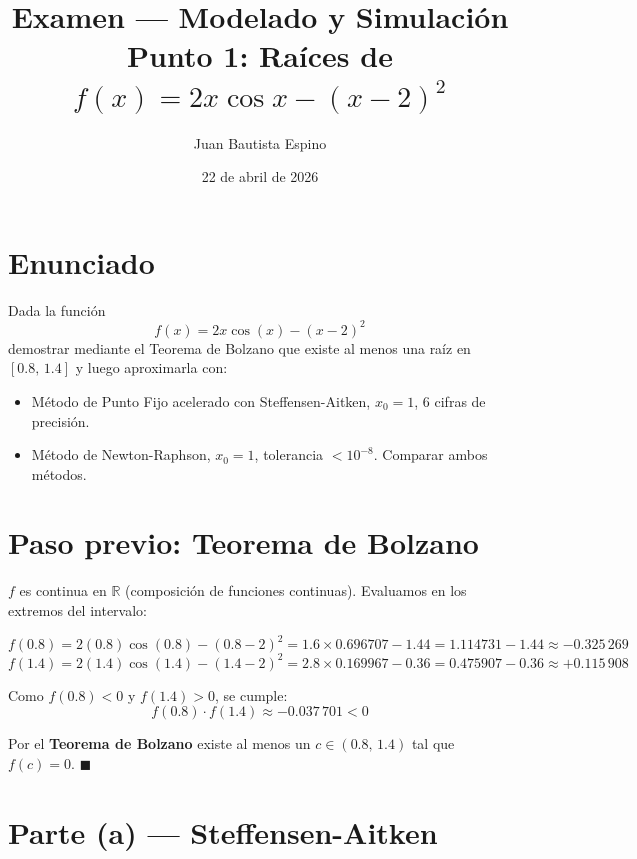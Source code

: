 \documentclass[12pt,a4paper]{article}
\title{\textbf{Examen --- Modelado y Simulaci\'on}\\[0.3em]
       {\large Punto 1: Ra\'ices de $f(x)=2x\cos x-(x-2)^2$}}
\author{Juan Bautista Espino}
\date{22 de abril de 2026}
\begin{document}
\maketitle\thispagestyle{fancy}

\section*{Enunciado}

Dada la funci\'on
\[
  f(x) = 2x\cos(x) - (x-2)^2
\]
demostrar mediante el Teorema de Bolzano que existe al menos una ra\'iz en
$[0.8,\,1.4]$ y luego aproximarla con:
\begin{itemize}
  \item[(a)] M\'etodo de Punto Fijo acelerado con Steffensen-Aitken, $x_0=1$, 6 cifras de precisi\'on.
  \item[(b)] M\'etodo de Newton-Raphson, $x_0=1$, tolerancia $<10^{-8}$. Comparar ambos m\'etodos.
\end{itemize}

\section*{Paso previo: Teorema de Bolzano}

$f$ es continua en $\mathbb{R}$ (composici\'on de funciones continuas). Evaluamos en
los extremos del intervalo:

\[
  f(0.8) = 2(0.8)\cos(0.8) - (0.8-2)^2
         = 1.6 \times 0.696707 - 1.44
         = 1.114731 - 1.44
         \approx -0.325\,269
\]
\[
  f(1.4) = 2(1.4)\cos(1.4) - (1.4-2)^2
         = 2.8 \times 0.169967 - 0.36
         = 0.475907 - 0.36
         \approx +0.115\,908
\]

Como $f(0.8) < 0$ y $f(1.4) > 0$, se cumple:
\[
  f(0.8)\cdot f(1.4) \approx -0.037\,701 < 0
\]

Por el \textbf{Teorema de Bolzano} existe al menos un $c\in(0.8,\,1.4)$ tal que
$f(c)=0$. \hfill$\blacksquare$

\section*{Parte (a) --- Steffensen-Aitken}
\end{document}

